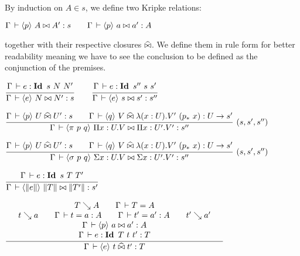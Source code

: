 \documentclass[a4paper,english]{lipics-utf8x}
\begin{document}
  By induction on $A \in s$, we define two Kripke relations:
  \begin{center}
  \(
    \Gamma \,\vdash \langle p \rangle~ A \mathrel{\bowtie} A' : s
    \qquad
    \Gamma \,\vdash \langle p \rangle~ a \mathrel{\bowtie} a' : A
  \)
  \end{center}
  together with their respective closures $\mathrel{\widehat{\bowtie}}$.
  We define them in rule form for better readability meaning we have to see the
  conclusion to be defined as the conjunction of the premises.

  \begin{mathc}
  \end{mathc}

  \begin{center}
  \(
    \ru{\Gamma \der e : \Id s\ N\ N'
      }{\Gamma \der \hideq{e} N \Er N' : s}
    \qquad
    \ru{\Gamma \der e : \Id s''\ s\ s'
      }{\Gamma \der \hideq{e} s \Er s' : s''}
  \)
  \end{center}

  \begin{center}
  \(
    \rux{\Gamma \der \hideq{p} U \hEr U' : s \qquad
          \Gamma \der \hideq{q} V \hEr \lambda (x:U). V'\ (p_*\ x) : U \to s'
        }{\Gamma \der \hideq{\pi\ p\ q} \Pi x:U.V \Er \Pi x:U'.V' : s''
        }{(s,s',s'')}
  \)
  \end{center}

  \begin{center}
  \(
    \rux{\Gamma \der \hideq{p} U \hEr U' : s \qquad
         \Gamma \der \hideq{q} V \hEr \lambda (x:U). V'\ (p_*\ x) : U \to s'
       }{\Gamma \der \hideq{\sigma\ p\ q} \Sigma x:U.V \Er \Sigma x:U'.V' : s''
       }{(s,s',s'')}
  \)
  \end{center}

  \begin{mathc}
  \end{mathc}

  \begin{center}
  \(
    \ru{\Gamma \der e : \Id s\ T\ T'
      }{\Gamma \der \hideq{\squash{e}} \squash{T} \Er \squash{T'} : s'}
  \)
  \end{center}

  \begin{center}
  \(
    \qru{T \rew A \qquad
         \Gamma \der T = A
       }{t \rew a \qquad
         \Gamma \der t = a : A \qquad
         \Gamma \der t' = a' : A \qquad
         t' \rew a'
       }{\Gamma \der \hideq{p} a \Er a' : A
       }{\Gamma \der e : \Id T\ t\ t' : T
       }{\Gamma \der \hideq{e} t \hEr t' : T}
  \)
  \end{center}
\end{document}
